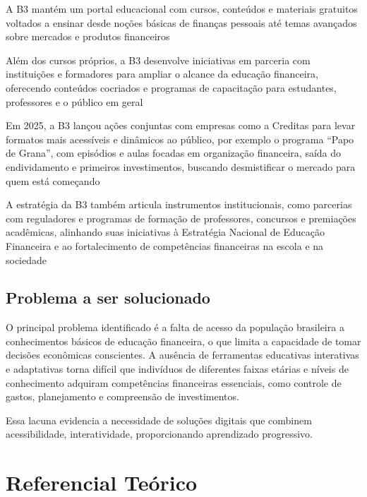 \documentclass[
	article,			%
	12pt,				%
	oneside,			%
	a4paper,			%
	english,			%
	brazil,				%
	sumario=tradicional
	]{abntex2}
\begin{document}
A B3 mantém um portal educacional com cursos, conteúdos e materiais gratuitos voltados a ensinar desde noções básicas de finanças pessoais até temas avançados sobre mercados e produtos financeiros

Além dos cursos próprios, a B3 desenvolve iniciativas em parceria com instituições e formadores para ampliar o alcance da educação financeira, oferecendo conteúdos cocriados e programas de capacitação para estudantes, professores e o público em geral

Em 2025, a B3 lançou ações conjuntas com empresas como a Creditas para levar formatos mais acessíveis e dinâmicos ao público, por exemplo o programa “Papo de Grana”, com episódios e aulas focadas em organização financeira, saída do endividamento e primeiros investimentos, buscando desmistificar o mercado para quem está começando


A estratégia da B3 também articula instrumentos institucionais, como parcerias com reguladores e programas de formação de professores, concursos e premiações acadêmicas, alinhando suas iniciativas à Estratégia Nacional de Educação Financeira e ao fortalecimento de competências financeiras na escola e na sociedade


\subsection{Problema a ser solucionado}

O principal problema identificado é a falta de acesso da população brasileira a conhecimentos básicos de educação financeira, o que limita a capacidade de tomar decisões econômicas conscientes. A ausência de ferramentas educativas interativas e adaptativas torna difícil que indivíduos de diferentes faixas etárias e níveis de conhecimento adquiram competências financeiras essenciais, como controle de gastos, planejamento e compreensão de investimentos.  

Essa lacuna evidencia a necessidade de soluções digitais que combinem acessibilidade, interatividade, proporcionando aprendizado progressivo.





\section{Referencial Teórico}
\end{document}
